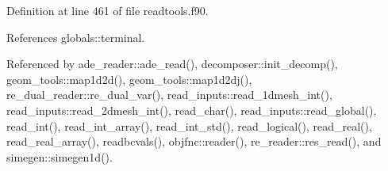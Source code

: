 Definition at line 461 of file readtools.\+f90.



References globals\+::terminal.



Referenced by ade\+\_\+reader\+::ade\+\_\+read(), decomposer\+::init\+\_\+decomp(), geom\+\_\+tools\+::map1d2d(), geom\+\_\+tools\+::map1d2dj(), re\+\_\+dual\+\_\+reader\+::re\+\_\+dual\+\_\+var(), read\+\_\+inputs\+::read\+\_\+1dmesh\+\_\+int(), read\+\_\+inputs\+::read\+\_\+2dmesh\+\_\+int(), read\+\_\+char(), read\+\_\+inputs\+::read\+\_\+global(), read\+\_\+int(), read\+\_\+int\+\_\+array(), read\+\_\+int\+\_\+std(), read\+\_\+logical(), read\+\_\+real(), read\+\_\+real\+\_\+array(), readbcvals(), objfnc\+::reader(), re\+\_\+reader\+::res\+\_\+read(), and simegen\+::simegen1d().


